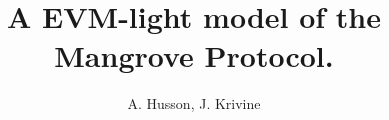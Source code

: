 \documentclass[12pt]{extarticle}
\begin{document}
\title{A EVM-light model of the Mangrove Protocol.}
\author{A. Husson, J. Krivine}
\date{}
\maketitle

\def\Op{\mathsf{Op}}
\def\call#1{\mathtt{call}(#1)}
\def\dcall#1{\mathtt{dcall}(#1)}
\def\sstore#1{\mathtt{sstore}(#1)}
\def\sload#1{\mathtt{sload}(#1)}
\def\brd{\mathtt{rdata}}
\def\bcd{\mathtt{cdata}}
\def\hsh#1{\mathtt{hash}(#1)}
\def\return#1{\mathtt{return}(#1)}
\def\revert#1{\mathtt{revert}(#1)}
\def\switch#1{\mathtt{if}(#1)}
\def\while#1{\mathtt{while}(#1)}

\def\Nat{\mathbb{N}}
\def\Uint{\mathbb{U}}
\def\Bool{\mathbb{B}}
\def\Addr{\mathbb{A}}
\def\Str{\mathbb{S}}
\def\ary#1{\left[{#1}\right]}
\def\z{\mathbf{0}}
\def\zMem{\z_\memory}
\def\zArray{[]}
\def\zStore{\z_\textit{store}}
\def\zBytecode{\z_{\texttt{B}}}


\def\Ctr{\mathsf{Ctr}}
\def\Abi{\textit{ABI}}
\def\Block{\mathbf{S}}
\def\tx{\mathsf{tx}}
\def\transactions{\textit{Transactions}}
\def\ctx{\mathsf{Ctx}}

\def\thisVar{\texttt{this}}
\def\thisVal{\textit{this}}

\def\stateVal{\textit{state}}

\newcommand{\initStep}[3]{\mathsf{Step}^{#1}_{#2.#3}}

\def\senderVar{\texttt{sender}}
\def\senderVal{\textit{sender}}

\def\returnDataVal{\textit{returndata}}
\def\dataVal{\textit{data}}
\def\returnDataVar{\texttt{returndata}}
\def\gasleftVal{\textit{gasleft}}
\def\gas{\textit{gas}}
\def\gasleftVar{\texttt{gasleft}}
\def\originVal{\textit{origin}}
\def\toVal{\textit{to}}
\def\fnVal{\textit{fn}}
\def\gasVal{\textit{gas}}
\def\cd{\chi}
\def\callDataVar{\texttt{calldata}}
\def\callDataVal{\textit{calldata}}
\def\memory{\textit{mem}}
\def\step{\mathsf{Step}}
\def\steps{\textit{Steps}}
\def\endStep{\mathsf{End}}
\def\continuation#1{\textit{continuation}(#1)}
\def\instruction#1{\textit{instruction}(#1)}

\def\Byt{\mathtt{B}}

\def\Exec{\mathbf{E}}
\def\rlab#1{\;\mathtt{#1}}
\def\llab#1{\mathtt{#1}\;}
\def\comp{\mathrel{\|}}
\def\Pending{\mathsf{Pending}}
\def\Def{\mathsf{Def}}
\def\require{\texttt{require}}
\def\Revert{\mathit{Revert}}
\def\rar{\dashrightarrow}

\def\dcl{\delta_{\mathsf{call}}}
\def\dxp{\delta_{\mathsf{exp}}}
\def\dsw{\delta_{\mathsf{sw}}}
\def\dsr{\delta_{\mathsf{sr}}}
\def\dmr{\delta_{\mathsf{mr}}}
\def\denv{\delta_{\mathsf{env}}}
\def\dcd{\delta_{\mathsf{dcd}}}
\def\drd{\delta_{\mathsf{drd}}}
\end{document}
